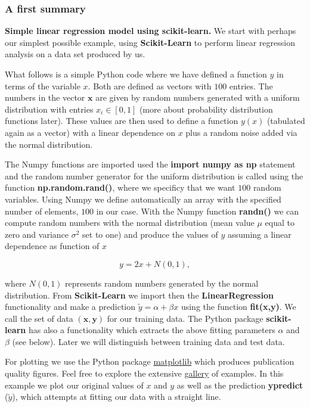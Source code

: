 \documentclass{beamer}
\begin{document}
\begin{frame}
\frametitle{A first summary}

\noindent\textbf{Simple linear regression model using \textbf{scikit-learn}.}
We start with perhaps our simplest possible example, using \textbf{Scikit-Learn} to perform linear regression analysis on a data set produced by us. 

What follows is a simple Python code where we have defined a function
$y$ in terms of the variable $x$. Both are defined as vectors with  $100$ entries. 
The numbers in the vector $\bm{x}$ are given
by random numbers generated with a uniform distribution with entries
$x_i \in [0,1]$ (more about probability distribution functions
later). These values are then used to define a function $y(x)$
(tabulated again as a vector) with a linear dependence on $x$ plus a
random noise added via the normal distribution.

The Numpy functions are imported used the \textbf{import numpy as np}
statement and the random number generator for the uniform distribution
is called using the function \textbf{np.random.rand()}, where we specificy
that we want $100$ random variables.  Using Numpy we define
automatically an array with the specified number of elements, $100$ in
our case.  With the Numpy function \textbf{randn()} we can compute random
numbers with the normal distribution (mean value $\mu$ equal to zero and
variance $\sigma^2$ set to one) and produce the values of $y$ assuming a linear
dependence as function of $x$

\[
y = 2x+N(0,1),
\]

where $N(0,1)$ represents random numbers generated by the normal
distribution.  From \textbf{Scikit-Learn} we import then the
\textbf{LinearRegression} functionality and make a prediction $\tilde{y} =
\alpha + \beta x$ using the function \textbf{fit(x,y)}. We call the set of
data $(\bm{x},\bm{y})$ for our training data. The Python package
\textbf{scikit-learn} has also a functionality which extracts the above
fitting parameters $\alpha$ and $\beta$ (see below). Later we will
distinguish between training data and test data.

For plotting we use the Python package
\href{{https://matplotlib.org/}}{matplotlib} which produces publication
quality figures. Feel free to explore the extensive
\href{{https://matplotlib.org/gallery/index.html}}{gallery} of examples. In
this example we plot our original values of $x$ and $y$ as well as the
prediction \textbf{ypredict} ($\tilde{y}$), which attempts at fitting our
data with a straight line.


\end{frame}
\end{document}
